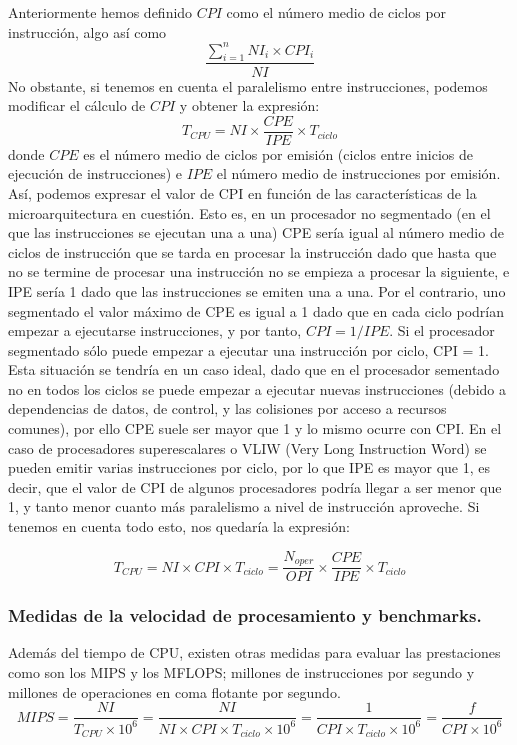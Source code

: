 \documentclass[a4paper, 11pt]{article}
\begin{document}
Anteriormente hemos definido $CPI$ como el número medio de ciclos por instrucción, algo así como $$\frac{\sum_{i=1}^{n}NI_i \times CPI_i}{NI}$$ No obstante, si tenemos en cuenta el paralelismo entre instrucciones, podemos modificar el cálculo de $CPI$ y obtener la expresión:
$$T_{CPU}=NI \times \frac{CPE}{IPE} \times T_{ciclo}$$
donde $CPE$ es el número medio de ciclos por emisión (ciclos entre inicios de ejecución de instrucciones) e $IPE$ el número medio de instrucciones por emisión. Así, podemos expresar el valor de CPI en función de las características de la microarquitectura en cuestión. Esto es, en un procesador no segmentado (en el que las instrucciones se ejecutan una a una) CPE sería igual al número medio de ciclos de instrucción que se tarda en procesar la instrucción dado que hasta que no se termine de procesar una instrucción no se empieza a procesar la siguiente, e IPE sería 1 dado que las instrucciones se emiten una a una. Por el contrario, uno segmentado el valor máximo de CPE es igual a 1 dado que en cada ciclo podrían empezar a ejecutarse instrucciones, y por tanto, $CPI = 1/IPE$. Si el procesador segmentado sólo puede empezar a ejecutar una instrucción por ciclo, CPI = 1. Esta situación se tendría en un caso ideal, dado que en el procesador sementado no en todos los ciclos se puede empezar a ejecutar nuevas instrucciones (debido a dependencias de datos, de control, y las colisiones por acceso a recursos comunes), por ello CPE suele ser mayor que 1 y lo mismo ocurre con CPI. En el caso de procesadores superescalares o  VLIW (Very Long Instruction Word) se pueden emitir varias instrucciones por ciclo, por lo que IPE es mayor que 1, es decir, que el valor de CPI de algunos procesadores podría llegar a ser menor que 1, y tanto menor cuanto más paralelismo a nivel de instrucción aproveche. 
Si tenemos en cuenta todo esto, nos quedaría la expresión:

$$T_{CPU}=NI \times CPI \times T_{ciclo} = \frac{N_{oper}}{OPI} \times \frac{CPE}{IPE} \times T_{ciclo} $$ 

\subsubsection{Medidas de la velocidad de procesamiento y benchmarks.}

Además del tiempo de CPU, existen otras medidas para evaluar las prestaciones como son los MIPS y los MFLOPS; millones de instrucciones por segundo y millones de operaciones en coma flotante por segundo. $$MIPS = \frac{NI}{T_{CPU} \times 10^6} = \frac{NI}{NI \times CPI \times T_{ciclo} \times 10^6} = \frac{1}{CPI \times T_{ciclo} \times 10^6} = \frac{f}{CPI \times 10^6} $$ 
\end{document}
